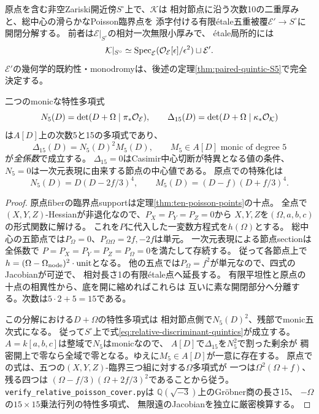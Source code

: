 \begin{theorem}[二重節点とCasimir臨界値の五次因数分解]
\label{thm:critical-discriminant-quintics}
原点を含む非空Zariski開近傍$S^\circ$上で、$\mathcal K$は
相対節点に沿う次数10の二重厚みと、総中心の滑らかなPoisson臨界点を
添字付ける有限\'{e}tale五重被覆$\mathcal E'\to S^\circ$に開閉分解する。
前者は$\mathcal E|_{S^\circ}$の相対一次無限小厚みで、
\'{e}tale局所的には
\[
 \mathcal K|_{S^\circ}\simeq
 \operatorname{Spec}_{\mathcal E}(\mathcal O_{\mathcal E}[\epsilon]/\epsilon^2)
 \sqcup\mathcal E'.
\]
$\mathcal E'$の幾何学的既約性・monodromyは、後述の定理\ref{thm:paired-quintic-S5}で完全決定する。

二つのmonicな特性多項式
\[
 N_5(D)=\det(D+\Omega\mid\pi_*\mathcal O_{\mathcal E}),\qquad
 \Delta_{15}(D)=\det(D+\Omega\mid\kappa_*\mathcal O_{\mathcal K})
\]
は$A[D]$上の次数5と15の多項式であり、
\begin{equation}\label{eq:relative-discriminant-quintics}
 \boxed{\Delta_{15}(D)=N_5(D)^2M_5(D)},\qquad
 M_5\in A[D]\text{ monic of degree }5
\end{equation}
が\emph{全係数}で成立する。
$\Delta_{15}=0$はCasimir中心切断が特異となる値の条件、
$N_5=0$は一次元表現に由来する節点の中心値である。
原点での特殊化は
\[
 N_5(D)=D(D-2f/3)^4,\qquad
 M_5(D)=(D-f)(D+f/3)^4.
\]
\end{theorem}
\begin{proof}
原点fiberの臨界点supportは定理\ref{thm:ten-poisson-points}の十点。
全点で$(X,Y,Z)$-Hessianが非退化なので、$P_X=P_Y=P_Z=0$から
$X,Y,Z$を$(\Omega,a,b,c)$の形式関数に解ける。
これを$P$に代入した一変数方程式を$h(\Omega)$とする。
総中心の五節点では$P_\Omega=0$、$P_{\Omega\Omega}=2f,-2f$は単元。
一次元表現による節点sectionは全係数で
$P=P_X=P_Y=P_Z=P_\Omega=0$を満たして存続する。
従って各節点上で$h=(\Omega-\Omega_{\rm node})^2\cdot\mathrm{unit}$となる。
他の五点では$P_\Omega=f^2$が単元なので、四式のJacobianが可逆で、
相対長さ1の有限\'{e}tale点へ延長する。
有限平坦性と原点の十点の相異性から、底を開に縮めればこれらは
互いに素な開閉部分へ分離する。次数は$5\cdot2+5=15$である。

この分解における$D+\Omega$の特性多項式は
相対節点側で$N_5(D)^2$、残部でmonic五次式になる。
従って$S^\circ$上で式\eqref{eq:relative-discriminant-quintics}が成立する。
$A=k[a,b,c]$は整域で$N_5$はmonicなので、
$A[D]$で$\Delta_{15}$を$N_5^2$で割った剰余が
稠密開上で零なら全域で零となる。ゆえに$M_5\in A[D]$が一意に存在する。
原点での式は、五つの$(X,Y,Z)$-臨界三つ組に対する$\Omega$多項式が
一つは$\Omega^2(\Omega+f)$、残る四つは
$(\Omega-f/3)(\Omega+2f/3)^2$であることから従う。
\texttt{verify\_relative\_poisson\_cover.py}は
$\mathbb Q(\sqrt{-3})$上のGr\"obner商の長さ15、
$-\Omega$の$15\times15$乗法行列の特性多項式、
無限遠のJacobianを独立に厳密検算する。
\end{proof}

